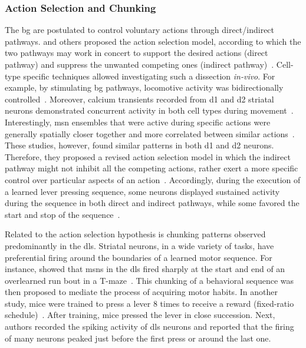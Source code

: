 \subsubsection{Action Selection and Chunking}
The \gls{bg} are postulated to control voluntary actions through direct/indirect pathways.
 and others proposed the action selection model, according to which the two pathways may work in concert to support the desired actions (direct pathway) and suppress the unwanted competing ones (indirect pathway)~\cite{Mink1996}.
Cell-type specific techniques allowed investigating such a dissection \textit{in-vivo}.
For example, by stimulating \gls{bg} pathways, locomotive activity was bidirectionally controlled~\cite{Kravitz2010Nature}.
Moreover, calcium transients recorded from \gls{d1} and \gls{d2} striatal neurons demonstrated concurrent activity in both cell types during movement~\cite{Cui2013Nature,Barbera2016Neuron}.
Interestingly, \gls{msn} ensembles that were active during specific actions were generally spatially closer together and more correlated between similar actions~\cite{Klaus2017Neuron}.
These studies, however, found similar patterns in both \gls{d1} and \gls{d2} neurons.
Therefore, they proposed a revised action selection model in which the indirect pathway might not inhibit all the competing actions, rather exert a more specific control over particular aspects of an action~\cite{Klaus2017Neuron}.
Accordingly, during the execution of a learned lever pressing sequence, some neurons displayed sustained activity during the sequence in both direct and indirect pathways, while some favored the start and stop of the sequence~\cite{Jin2014NN}.
\par
Related to the action selection hypothesis is chunking patterns observed predominantly in the \gls{dls}.
Striatal neurons, in a wide variety of tasks, have preferential firing around the boundaries of a learned motor sequence.
For instance,  showed that \glspl{msn} in the \gls{dls} fired sharply at the start and end of an overlearned run bout in a T-maze~\cite{Barnes2005Nature}.
This chunking of a behavioral sequence was then proposed to mediate the process of acquiring motor habits.
In another study, mice were trained to press a lever 8 times to receive a reward (fixed-ratio schedule)~\cite{Jin2010N}.
After training, mice pressed the lever in close succession.
Next, authors recorded the spiking activity of \gls{dls} neurons and reported that the firing of many neurons peaked just before the first press or around the last one.
